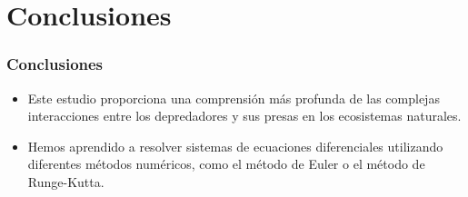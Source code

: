 \documentclass{beamer}
\begin{document}






\section{Conclusiones}
\begin{frame}
	\frametitle{Conclusiones}
	\begin{minipage}{10cm}
	\begin{itemize}
		\item Este estudio proporciona una comprensi\'on más profunda de las complejas interacciones entre los depredadores y sus presas en
		los ecosistemas naturales.
		\item Hemos aprendido a resolver sistemas de ecuaciones diferenciales utilizando diferentes
		métodos numéricos, como el método de Euler o el método de Runge-Kutta.
	
	\end{itemize}	
	\end{minipage}
\end{frame}
\end{document}

